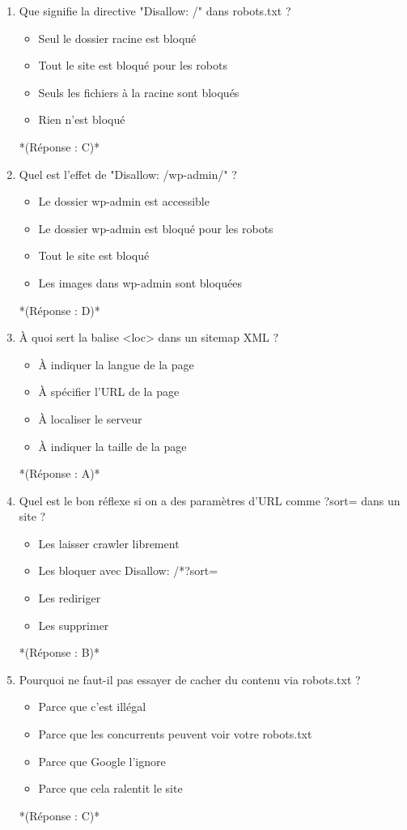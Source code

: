 \documentclass[12pt,a4paper,twoside]{report}
\begin{document}
\begin{enumerate}
\item Que signifie la directive "Disallow: /" dans robots.txt ?
\begin{itemize}
\item[A)] Seul le dossier racine est bloqué
\item[B)] Tout le site est bloqué pour les robots
\item[C)] Seuls les fichiers à la racine sont bloqués
\item[D)] Rien n'est bloqué
\end{itemize}
*(Réponse : C)*

\item Quel est l'effet de "Disallow: /wp-admin/" ?
\begin{itemize}
\item[A)] Le dossier wp-admin est accessible
\item[B)] Le dossier wp-admin est bloqué pour les robots
\item[C)] Tout le site est bloqué
\item[D)] Les images dans wp-admin sont bloquées
\end{itemize}
*(Réponse : D)*

\item À quoi sert la balise <loc> dans un sitemap XML ?
\begin{itemize}
\item[A)] À indiquer la langue de la page
\item[B)] À spécifier l'URL de la page
\item[C)] À localiser le serveur
\item[D)] À indiquer la taille de la page
\end{itemize}
*(Réponse : A)*

\item Quel est le bon réflexe si on a des paramètres d'URL comme ?sort= dans un site ?
\begin{itemize}
\item[A)] Les laisser crawler librement
\item[B)] Les bloquer avec Disallow: /*?sort=
\item[C)] Les rediriger
\item[D)] Les supprimer
\end{itemize}
*(Réponse : B)*

\item Pourquoi ne faut-il pas essayer de cacher du contenu via robots.txt ?
\begin{itemize}
\item[A)] Parce que c'est illégal
\item[B)] Parce que les concurrents peuvent voir votre robots.txt
\item[C)] Parce que Google l'ignore
\item[D)] Parce que cela ralentit le site
\end{itemize}
*(Réponse : C)*


\end{enumerate}
\end{document}
